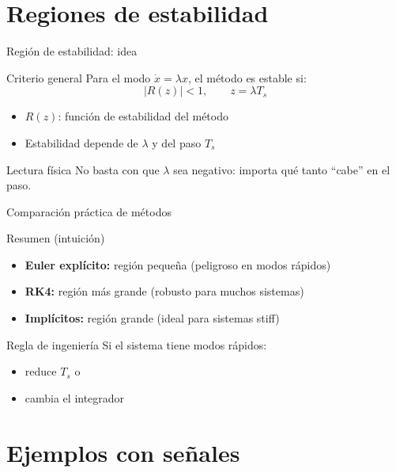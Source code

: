 \documentclass[aspectratio=169,10pt]{beamer}
\newcommand{\importantbox}[2][Importante]{%
\begin{alertblock}{#1}#2\end{alertblock}}
\begin{document}
\section{Regiones de estabilidad}

\begin{frame}{Región de estabilidad: idea}
\small
\begin{block}{Criterio general}
Para el modo $\dot{x}=\lambda x$, el método es estable si:
\[
|R(z)|<1,\qquad z=\lambda T_s
\]
\end{block}

\begin{itemize}
\item $R(z)$: función de estabilidad del método
\item Estabilidad depende de $\lambda$ y del paso $T_s$
\end{itemize}

\importantbox[Lectura física]{
No basta con que $\lambda$ sea negativo: importa qué tanto ``cabe'' en el paso.
}
\end{frame}

\begin{frame}{Comparación práctica de métodos}
\small
\begin{block}{Resumen (intuición)}
\begin{itemize}
\item \textbf{Euler explícito:} región pequeña (peligroso en modos rápidos)
\item \textbf{RK4:} región más grande (robusto para muchos sistemas)
\item \textbf{Implícitos:} región grande (ideal para sistemas stiff)
\end{itemize}
\end{block}

\importantbox[Regla de ingeniería]{
Si el sistema tiene modos rápidos:
\begin{itemize}
\item reduce $T_s$ o
\item cambia el integrador
\end{itemize}
}
\end{frame}

\section{Ejemplos con señales}
\end{document}
